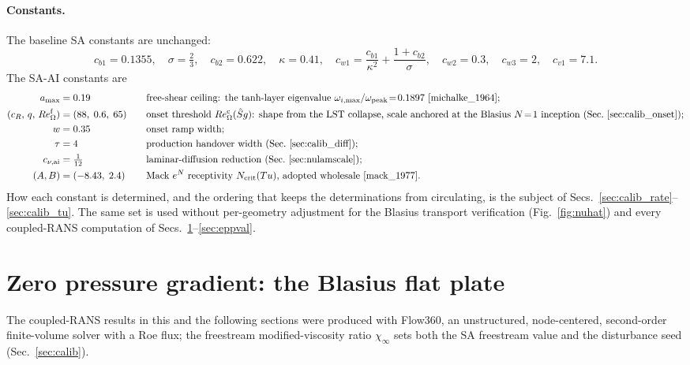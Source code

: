 \documentclass[journal]{new-aiaa}
\begin{document}
\paragraph{Constants.} The baseline SA constants are unchanged:
\begin{equation*}
  c_{b1}=0.1355,\quad \sigma=\tfrac{2}{3},\quad c_{b2}=0.622,\quad
  \kappa=0.41,\quad c_{w1}=\frac{c_{b1}}{\kappa^2}+\frac{1+c_{b2}}{\sigma},\quad
  c_{w2}=0.3,\quad c_{w3}=2,\quad c_{v1}=7.1 .
\end{equation*}
The SA-AI constants are
\begin{equation*}
  \begin{aligned}
    a_{\max}&=0.19 &\quad&\text{free-shear ceiling: the tanh-layer eigenvalue $\omega_{i,\max}/\omega_{\mathrm{peak}}\!=\!0.1897$ \cite{michalke_1964};}\\
    (c_R,\,q,\,Re_\Omega^{\mathrm{f}})&=(88,\;0.6,\;65) &&\text{onset threshold $Re_\Omega^{\mathrm c}(\hat S g)$: shape from the LST collapse, scale anchored at the Blasius $N\!=\!1$ inception (Sec.~\ref{sec:calib_onset});}\\
    w&=0.35 &&\text{onset ramp width;}\\
    \tau&=4 &&\text{production handover width (Sec.~\ref{sec:calib_diff});}\\
    c_{\nu,\mathrm{ai}}&=\tfrac{1}{12} &&\text{laminar-diffusion reduction (Sec.~\ref{sec:nulamscale});}\\
    (A,B)&=(-8.43,\;2.4) &&\text{Mack $e^N$ receptivity $N_\mathrm{crit}(Tu)$, adopted wholesale \cite{mack_1977}.}
  \end{aligned}
\end{equation*}
How each constant is determined, and the ordering that keeps the
determinations from circulating, is the subject of
Secs.~\ref{sec:calib_rate}--\ref{sec:calib_tu}. The
same set is used without per-geometry adjustment for the Blasius transport
verification (Fig.~\ref{fig:nuhat}) and every coupled-RANS computation of
Secs.~\ref{sec:flatplate}--\ref{sec:eppval}.

\section{Zero pressure gradient: the Blasius flat plate}\label{sec:flatplate}

The coupled-RANS results in this and the following sections were produced with
Flow360, an unstructured, node-centered, second-order finite-volume solver with
a Roe flux; the
freestream modified-viscosity ratio $\chi_\infty$ sets both the SA freestream value
and the disturbance seed (Sec.~\ref{sec:calib}).
\end{document}
